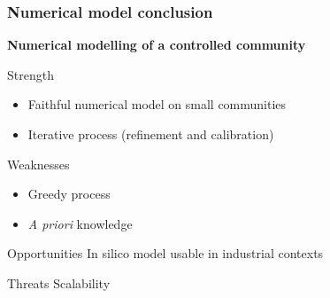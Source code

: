 \documentclass[8pt,usenames,dvipsnames]{beamer}
\begin{document}
\begin{frame}
\frametitle{Numerical model conclusion}
\centering
\textbf{\huge Numerical modelling of a controlled community}

\begin{minipage}{0.45\textwidth}
\vspace{0.3cm}
\begin{block}{Strength}
\begin{itemize}
\item Faithful numerical model on small communities %
\item Iterative process (refinement and calibration)
\end{itemize}
\end{block} %
\end{minipage}\hfill
\hspace{0.5cm}
\hfill
\begin{minipage}{0.45\textwidth}
\begin{block}{Weaknesses}
\begin{itemize}
\item Greedy process
\item \textit{A priori} knowledge
\end{itemize}
\end{block}

\end{minipage}


\begin{minipage}{0.45\textwidth}
\begin{block}{Opportunities}
In silico model usable in industrial contexts
\end{block} %
\end{minipage}\hfill
\hspace{0.5cm}
\hfill
\begin{minipage}{0.45\textwidth}
\begin{block}{Threats}
Scalability
\end{block}
\end{minipage}


\end{frame}
\end{document}
